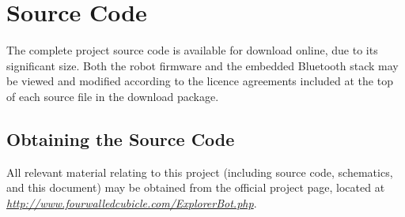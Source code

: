 \chapter{Source Code}
\label{Appendix B}

The complete project source code is available for download online, due to its significant size. Both the robot firmware and the embedded Bluetooth stack may be viewed and modified according to the licence agreements included at the top of each source file in the download package.

\section{Obtaining the Source Code}

All relevant material relating to this project (including source code, schematics, and this document) may be obtained from the official project page, located at \\ \href{http://www.fourwalledcubicle.com/ExplorerBot.php}{\textit{http://www.fourwalledcubicle.com/ExplorerBot.php}}.
